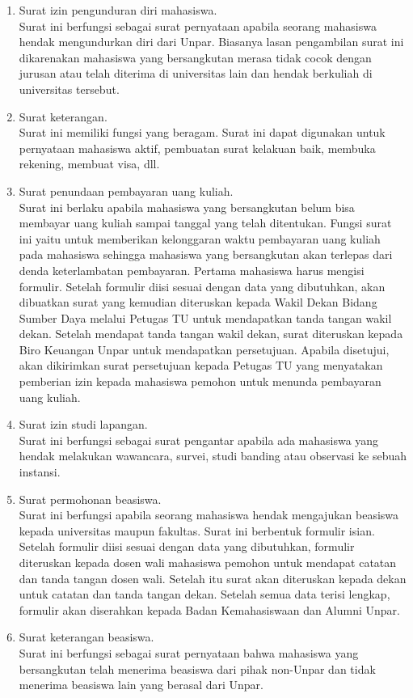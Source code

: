 \begin{enumerate}
	\item Surat izin pengunduran diri mahasiswa. \\
	Surat ini berfungsi sebagai surat pernyataan apabila seorang mahasiswa hendak mengundurkan diri dari Unpar. Biasanya lasan pengambilan surat ini dikarenakan mahasiswa yang bersangkutan merasa tidak cocok dengan jurusan atau telah diterima di universitas lain dan hendak berkuliah di universitas tersebut.
	
	\item Surat keterangan. \\
	Surat ini memiliki fungsi yang beragam. Surat ini dapat digunakan untuk pernyataan mahasiswa aktif, pembuatan surat kelakuan baik, membuka rekening, membuat visa, dll.
	
	\item Surat penundaan pembayaran uang kuliah. \\
	Surat ini berlaku apabila mahasiswa yang bersangkutan belum bisa membayar uang kuliah sampai tanggal yang telah ditentukan. Fungsi surat ini yaitu untuk memberikan kelonggaran waktu pembayaran uang kuliah pada mahasiswa sehingga mahasiswa yang bersangkutan akan terlepas dari denda keterlambatan pembayaran. Pertama mahasiswa harus mengisi formulir. Setelah formulir diisi sesuai dengan data yang dibutuhkan, akan dibuatkan surat yang kemudian diteruskan kepada Wakil Dekan Bidang Sumber Daya melalui Petugas TU untuk mendapatkan tanda tangan wakil dekan. Setelah mendapat tanda tangan wakil dekan, surat diteruskan kepada Biro Keuangan Unpar untuk mendapatkan persetujuan. Apabila disetujui, akan dikirimkan surat persetujuan kepada Petugas TU yang menyatakan pemberian izin kepada mahasiswa pemohon untuk menunda pembayaran uang kuliah.
	
	\item Surat izin studi lapangan. \\
	Surat ini berfungsi sebagai surat pengantar apabila ada mahasiswa yang hendak melakukan wawancara, survei, studi banding atau observasi ke sebuah instansi.
	
	\item Surat permohonan beasiswa. \\
	Surat ini berfungsi apabila seorang mahasiswa hendak mengajukan beasiswa kepada universitas maupun fakultas. Surat ini berbentuk formulir isian. Setelah formulir diisi sesuai dengan data yang dibutuhkan, formulir diteruskan kepada dosen wali mahasiswa pemohon untuk mendapat catatan dan tanda tangan dosen wali. Setelah itu surat akan diteruskan kepada dekan untuk catatan dan tanda tangan dekan. Setelah semua data terisi lengkap, formulir akan diserahkan kepada Badan Kemahasiswaan dan Alumni Unpar.
	
	\item Surat keterangan beasiswa. \\
	Surat ini berfungsi sebagai surat pernyataan bahwa mahasiswa yang bersangkutan telah menerima beasiswa dari pihak non-Unpar dan tidak menerima beasiswa lain yang berasal dari Unpar.
\end{enumerate}


